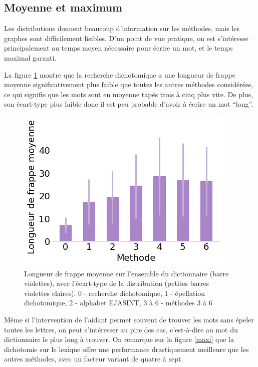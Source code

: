 \documentclass[twoside,twocolumn]{article}
\begin{document}
\subsection{Moyenne et maximum}

Les distributions donnent beaucoup d'information sur les méthodes, mais les graphes sont difficilement lisibles. D'un point de vue pratique, on est s'intéresse principalement au temps moyen nécessaire pour écrire un mot, et le temps maximal garanti.

La figure \ref{mean} montre que la recherche dichotomique a une longueur de frappe moyenne significativement plus faible que toutes les autres méthodes considérées, ce qui signifie que les mots sont en moyenne tapés trois à cinq plus vite. De plus, son écart-type plus faible donc il est peu probable d'avoir à écrire un mot ``long''.

\begin{center}
\begin{figure}
  \includegraphics[scale=0.5]{mean.png}
  \caption{Longueur de frappe moyenne sur l'ensemble du dictionnaire (barre violettes), avec l'écart-type de la distribution (petites barres violettes claires). 0 - recherche dichotomique, 1 - épellation dichotomique, 2 - alphabet EJASINT, 3 à 6 - méthodes 3 à 6}
  \label{mean}
\end{figure}
\end{center}

Même si l'intervention de l'aidant permet souvent de trouver les mots sans épeler toutes les lettres, on peut s'intéresser au pire des cas, c'est-à-dire au mot du dictionnaire le plus long à trouver. On remarque sur la figure \ref{maxi} que la dichotomie sur le lexique offre une performance drastiquement meilleure que les autres méthodes, avec un facteur variant de quatre à sept.
\end{document}
